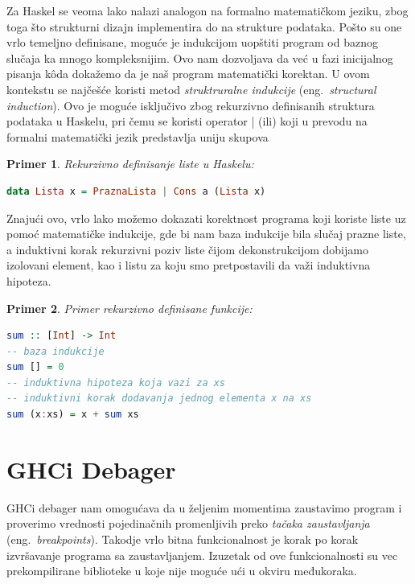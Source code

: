 \documentclass[a4paper]{article}
\newtheorem{primer}{Primer}[section]
\begin{document}
{{Za Haskel se veoma lako nalazi analogon na formalno matematičkom jeziku, zbog toga što strukturni dizajn implementira do na strukture podataka. Pošto su one vrlo temeljno definisane, moguće je indukcijom uopštiti program od baznog slučaja ka mnogo kompleksnijim. Ovo nam dozvoljava da već u fazi inicijalnog pisanja k\^{o}da dokažemo da je naš program matematički korektan. U ovom kontekstu se najčešće koristi metod {\em struktruralne indukcije}  (eng.~{\em structural induction}). Ovo je moguće isključivo zbog rekurzivno definisanih struktura podataka u Haskelu, pri čemu se koristi operator | (ili) koji u prevodu na formalni matematički jezik predstavlja uniju skupova\cite{craftOfFuncProg}
\newpage
\begin{primer}
Rekurzivno definisanje liste u Haskelu:
\end{primer}
\begin{lstlisting}[language=Haskell,frame=single, label=simple]
data Lista x = PraznaLista | Cons a (Lista x)
\end{lstlisting}
Znajući ovo, vrlo lako možemo dokazati korektnost programa koji koriste liste uz pomoć matematičke indukcije, gde bi nam baza indukcije bila slučaj prazne liste, a induktivni korak rekurzivni poziv liste čijom dekonstrukcijom dobijamo izolovani element, kao i listu za koju smo pretpostavili da važi induktivna hipoteza.
\begin{primer}
Primer rekurzivno definisane funkcije:
\end{primer}
\begin{lstlisting}[language=Haskell,frame=single, label=simple]
sum :: [Int] -> Int
-- baza indukcije
sum [] = 0
-- induktivna hipoteza koja vazi za xs
-- induktivni korak dodavanja jednog elementa x na xs
sum (x:xs) = x + sum xs 
\end{lstlisting}


\section{GHCi Debager}
GHCi debager nam omogućava da u željenim momentima zaustavimo program i proverimo vrednosti pojedinačnih promenljivih preko {\em tačaka zaustavljanja} (eng.~{\em breakpoints}). Takodje vrlo bitna funkcionalnost je korak po korak izvršavanje programa sa zaustavljanjem. Izuzetak od ove funkcionalnosti su vec prekompilirane biblioteke u koje nije moguće ući u okviru međukoraka.


}}
\end{document}
